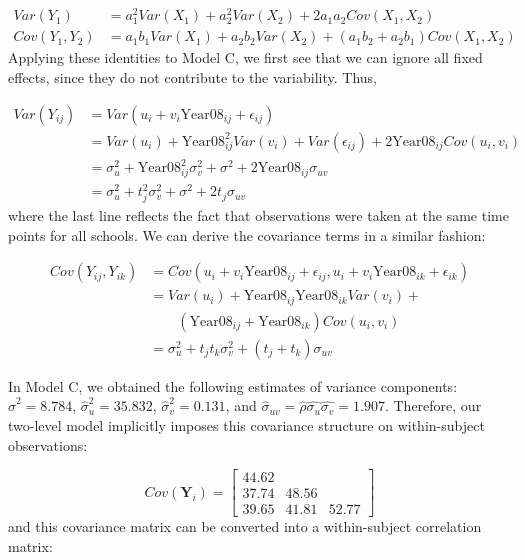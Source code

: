 \documentclass[
]{krantz}
\begin{document}
\begin{align*}
Var(Y_1) & = a^{2}_{1} Var(X_1) + a^{2}_{2} Var(X_2) + 2 a_1 a_2 Cov(X_1,X_2) \\
Cov(Y_1,Y_2) & = a_1 b_1 Var(X_1) + a_2 b_2 Var(X_2) + (a_1 b_2 + a_2 b_1) Cov(X_1,X_2)
\end{align*}
\noindent Applying these identities to Model C, we first see that we can ignore all fixed effects, since they do not contribute to the variability. Thus,

\begin{align*}
Var(Y_{ij}) & = Var(u_{i}+v_{i}\textrm{Year08}_{ij}+\epsilon_{ij}) \\
 & = Var(u_{i}) + \textrm{Year08}^{2}_{ij} Var(v_{i}) + Var(\epsilon_{ij}) + 2\textrm{Year08}_{ij} Cov(u_{i},v_{i}) \\
 & = \sigma_{u}^{2} + \textrm{Year08}^{2}_{ij} \sigma_{v}^{2} + \sigma^{2} + 2\textrm{Year08}_{ij}\sigma_{uv} \\
 & = \sigma_{u}^{2} + t^{2}_{j} \sigma_{v}^{2} + \sigma^{2} + 2t_{j}\sigma_{uv}
\end{align*}
\noindent where the last line reflects the fact that observations were taken at the same time points for all schools. We can derive the covariance terms in a similar fashion:

\begin{align*}
Cov(Y_{ij},Y_{ik}) & = Cov(u_{i}+ v_{i}\textrm{Year08}_{ij}+\epsilon_{ij}, u_{i}+v_{i}\textrm{Year08}_{ik}+\epsilon_{ik}) \\
 & = Var(u_{i}) + \textrm{Year08}_{ij}\textrm{Year08}_{ik} Var(v_{i}) + \\
 & \qquad (\textrm{Year08}_{ij} + \textrm{Year08}_{ik}) Cov(u_{i},v_{i}) \\
 & = \sigma_{u}^{2} + t_{j}t_{k} \sigma_{v}^{2} + (t_{j}+t_{k})\sigma_{uv}
\end{align*}

In Model C, we obtained the following estimates of variance components: \(\hat{\sigma}^{2}=8.784\), \(\hat{\sigma}^{2}_{u}=35.832\), \(\hat{\sigma}^{2}_{v}=0.131\), and \(\hat{\sigma}_{uv}=\hat{\rho}\hat{\sigma_{u}}\hat{\sigma_{v}}=1.907\). Therefore, our two-level model implicitly imposes this covariance structure on within-subject observations:

\[ Cov(\mathbf{Y}_i) =  \left[
          \begin{array}{cccc}
            44.62 & &   \\
            37.74 & 48.56 &  \\
            39.65 & 41.81 & 52.77
          \end{array} \right] \]
and this covariance matrix can be converted into a within-subject correlation matrix:
\end{document}
